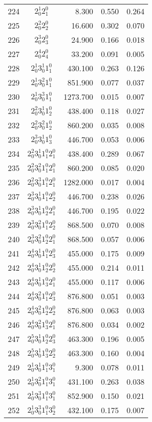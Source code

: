 \documentclass{revtex4}
\begin{document}
\begin{table}
\begin{tabular}{rcrrr}
224&$2_0^1 2_1^0$& 8.300& 0.550& 0.264\\
225&$2_0^2 2_2^0$& 16.600& 0.302& 0.070\\
226&$2_0^3 2_3^0$& 24.900& 0.166& 0.018\\
227&$2_0^4 2_4^0$& 33.200& 0.091& 0.005\\
228&$2_0^1 3_0^1 1_1^0$& 430.100& 0.263& 0.126\\
229&$2_0^1 3_0^2 1_1^0$& 851.900& 0.077& 0.037\\
230&$2_0^1 3_0^3 1_1^0$& 1273.700& 0.015& 0.007\\
231&$2_0^2 3_0^1 1_2^0$& 438.400& 0.118& 0.027\\
232&$2_0^2 3_0^2 1_2^0$& 860.200& 0.035& 0.008\\
233&$2_0^3 3_0^1 1_3^0$& 446.700& 0.053& 0.006\\
234&$2_0^2 3_0^1 1_1^0 2_1^0$& 438.400& 0.289& 0.067\\
235&$2_0^2 3_0^2 1_1^0 2_1^0$& 860.200& 0.085& 0.020\\
236&$2_0^2 3_0^3 1_1^0 2_1^0$& 1282.000& 0.017& 0.004\\
237&$2_0^3 3_0^1 1_1^0 2_2^0$& 446.700& 0.238& 0.026\\
238&$2_0^3 3_0^1 1_2^0 2_1^0$& 446.700& 0.195& 0.022\\
239&$2_0^3 3_0^2 1_1^0 2_2^0$& 868.500& 0.070& 0.008\\
240&$2_0^3 3_0^2 1_2^0 2_1^0$& 868.500& 0.057& 0.006\\
241&$2_0^4 3_0^1 1_1^0 2_3^0$& 455.000& 0.175& 0.009\\
242&$2_0^4 3_0^1 1_2^0 2_2^0$& 455.000& 0.214& 0.011\\
243&$2_0^4 3_0^1 1_3^0 2_1^0$& 455.000& 0.117& 0.006\\
244&$2_0^4 3_0^2 1_1^0 2_3^0$& 876.800& 0.051& 0.003\\
245&$2_0^4 3_0^2 1_2^0 2_2^0$& 876.800& 0.063& 0.003\\
246&$2_0^4 3_0^2 1_3^0 2_1^0$& 876.800& 0.034& 0.002\\
247&$2_0^5 3_0^1 1_2^0 2_3^0$& 463.300& 0.196& 0.005\\
248&$2_0^5 3_0^1 1_3^0 2_2^0$& 463.300& 0.160& 0.004\\
249&$2_0^1 3_0^1 1_1^0 3_1^0$& 9.300& 0.078& 0.011\\
250&$2_0^1 3_0^2 1_1^0 3_1^0$& 431.100& 0.263& 0.038\\
251&$2_0^1 3_0^3 1_1^0 3_1^0$& 852.900& 0.150& 0.021\\
252&$2_0^1 3_0^3 1_1^0 3_2^0$& 432.100& 0.175& 0.007\\

\end{tabular}
\end{table}
\end{document}
